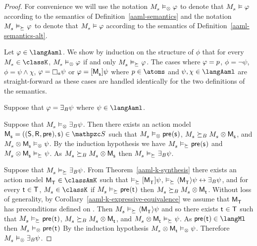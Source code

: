 \begin{proof}
For convenience we will use the notation $\kPModel{\kStateS} \entails_\exec \phi$ to denote that $\kPModel{\kStateS} \entails \phi$ according to the semantics of Definition~\ref{aaml-semantics} and the notation $\kPModel{\kStateS} \entails_{\simulates} \phi$ to denote that $\kPModel{\kStateS} \entails \phi$ according to the semantics of Definition~\ref{aaml-semantics-alt}.

Let $\phi \in \langAaml$.
We show by induction on the structure of $\phi$ that for every $\kPModel{\kStateS} \in \classK$, $\kPModel{\kStateS} \entails_\exec \phi$ if and only $\kPModel{\kStateS} \entails_{\simulates} \phi$.
The cases where $\varphi = p$, $\phi = \lnot \psi$,  $\phi = \psi \land \chi$, $\phi = \necessaryA \psi$ or $\phi = \actionA{\aPModel{\aStateS}} \psi$ where $\atomP \in \atoms$ and $\psi, \chi \in \langAaml$ are straight-forward as these cases are handled identically for the two definitions of the semantics.

Suppose that $\varphi = {\exists_{B}} \psi$ where $\psi \in \langAaml$.

Suppose that $\kPModel{\kStateS} \entails_\exec \someactsBs \psi$.
Then there exists an action model $\aPModelAndTuple{\aStateS} \in \aSignatureFamily$ such that $\kPModel{\kStateS} \entails_\exec \aPrecondition(\aStateS)$, $\kPModel{\kStateS} \simulatesBs \kPModel{\kStateS} \exec \aPModel{\aStateS}$, and $\kPModel{\kStateS} \exec \aPModel{\aStateS} \entails_\exec \psi$.
By the induction hypothesis we have $\kPModel{\kStateS} \entails_{\simulates} \aPrecondition(\aStateS)$ and $\kPModel{\kStateS} \exec \aPModel{\aStateS} \entails_{\simulates} \psi$.
As $\kPModel{\kStateS} \simulatesBs \kPModel{\kStateS} \exec \aPModel{\aStateS}$ then $\kPModel{\kStateS} \entails_{\simulates} \someactsBs \psi$.

Suppose that $\kPModel{\kStateS} \entails_{\simulates} \someactsBs \psi$.
From Theorem~\ref{aaml-k-synthesis} there exists an action model $\aPModel{\aStatesT} \in \classAmK$ such that 
$\entails_{\simulates} \actionA{\aPModel{\aStatesT}} \psi$,
$\entails_{\simulates} \actionE{\aPModel{\aStatesT}} \psi \iff \someactsBs \psi$, and
for every $\aStateT \in \aStatesT$, $\kPModel{\kStateS} \in \classK$ if $\kPModel{\kStateS} \entails_{\simulates} \aPrecondition(\aStateT)$ then $\kPModel{\kStateS} \simulatesBs \kPModel{\kStateS} \exec \aPModel{\aStateT}$.
Without loss of generality, by Corollary~\ref{aaml-k-expressive-equivalence} we assume that $\aPModel{\aStatesT}$ has preconditions defined on \langMl{}.
Then $\kPModel{\kStateS} \entails_{\simulates} \actionE{\aPModel{\aStatesT}} \psi$ and so there exists $\aStateT \in \aStatesT$ such that $\kPModel{\kStateS} \entails_{\simulates} \aPrecondition(\aStateT)$, $\kPModel{\kStateS} \simulatesBs \kPModel{\kStateS} \exec \aPModel{\aStateT}$, and $\kPModel{\kStateS} \exec \aPModel{\aStateT} \entails_{\simulates} \psi$.
As $\aPrecondition(\aStateT) \in \langMl$ then $\kPModel{\kStateS} \entails_{\exec} \aPrecondition(\aStateT)$
By the induction hypothesis $\kPModel{\kStateS} \exec \aPModel{\aStateT} \entails_{\exec} \psi$.
Therefore $\kPModel{\kStateS} \entails_\exec \someactsBs \psi$.
\end{proof}
